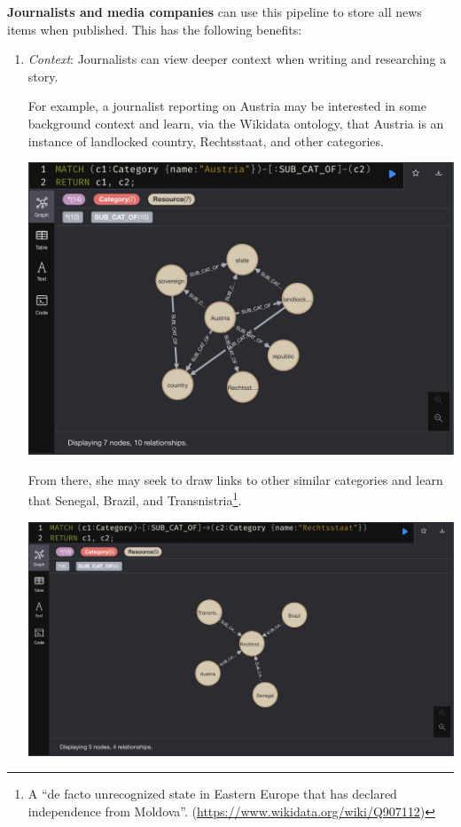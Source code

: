 \documentclass[11pt]{article}
\begin{document}
\textbf{Journalists and media companies} can use this pipeline to store all news items when published. This has the following benefits:
\begin{enumerate}
  \item{
    \textit{Context}: Journalists can view deeper context when writing and researching a story.

    For example, a journalist reporting on Austria may be interested in some background context and learn, via the Wikidata ontology, that Austria is an instance of landlocked country, Rechtsstaat, and other categories.
  
    \centerline{\includegraphics[scale=0.3]{use-case-1a}}

    From there, she may seek to draw links to other similar categories and learn that Senegal, Brazil, and Transnistria\footnote{A ``de facto unrecognized state in Eastern Europe that has declared independence from Moldova''. (\url{https://www.wikidata.org/wiki/Q907112})}.
  
    \centerline{\includegraphics[scale=0.3]{use-case-1b}}

}
\end{enumerate}
\end{document}
